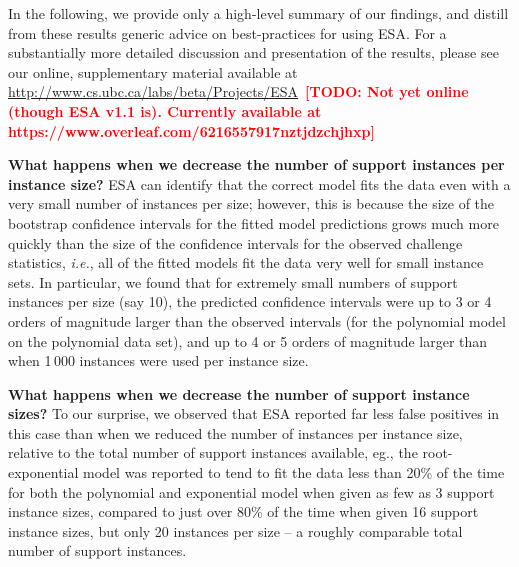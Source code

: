 \documentclass[aic]{iosart2x}
\newcommand{\ie}{\emph{i.e.}}
\newcommand{\todo}[1]{\textcolor{red}{\bf [TODO: #1]}}
\begin{document}
In the following, we provide only a high-level summary of our findings, and distill from these results generic advice on best-practices for using ESA. 
For a substantially more detailed discussion and presentation of the results, please see our online, supplementary material available at \url{http://www.cs.ubc.ca/labs/beta/Projects/ESA}~\todo{Not yet online (though ESA v1.1 is). Currently available at https://www.overleaf.com/6216557917nztjdzchjhxp}


\textbf{What happens when we decrease the number of support instances per instance size?}
ESA can identify that the correct model fits the data even with a very small number of instances per size; however, this is because the size of the bootstrap confidence intervals for the fitted model predictions grows much more quickly than the size of the confidence intervals for the observed challenge statistics, \ie{}, all of the fitted models fit the data very well for small instance sets. In particular, we found that for extremely small numbers of support instances per size (say 10), the predicted confidence intervals were up to 3 or 4 orders of magnitude larger than the observed intervals (for the polynomial model on the polynomial data set), and up to 4 or 5 orders of magnitude larger than when 1\,000 instances were used per instance size.

\textbf{What happens when we decrease the number of support instance sizes?}
To our surprise, we observed that ESA reported far less false positives in this case than when we reduced the number of instances per instance size, relative to the total number of support instances available, eg., the root-exponential model was reported to tend to fit the data less than 20\% of the time for both the polynomial and exponential model when given as few as 3 support instance sizes, compared to just over 80\% of the time when given 16 support instance sizes, but only 20 instances per size -- a roughly comparable total number of support instances.
\end{document}
